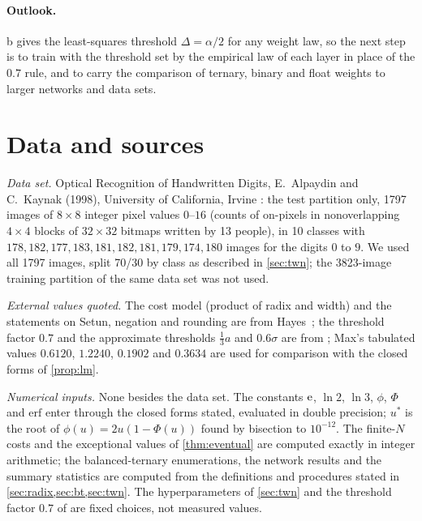 \documentclass[11pt]{article}
\theoremstyle{definition}\newtheorem{definition}[theorem]{Definition}
\theoremstyle{remark}\newtheorem{remark}[theorem]{Remark}
\begin{document}
\paragraph{Outlook.} b gives the least-squares threshold $\Delta=\alpha/2$ for any weight law, so the next step is to train with the threshold set by the empirical law of each layer in place of the $0.7$ rule, and to carry the comparison of ternary, binary and float weights to larger networks and data sets.

\section{Data and sources}\label{sec:data}
\emph{Data set.} Optical Recognition of Handwritten Digits, E.~Alpaydin and C.~Kaynak (1998), University of California, Irvine \cite{uci_digits}: the test partition only, 1797 images of $8\times8$ integer pixel values $0$--$16$ (counts of on-pixels in nonoverlapping $4\times4$ blocks of $32\times32$ bitmaps written by 13 people), in 10 classes with $178,182,177,183,181,182,181,179,174,180$ images for the digits $0$ to $9$. We used all 1797 images, split 70/30 by class as described in \cref{sec:twn}; the 3823-image training partition of the same data set was not used.

\emph{External values quoted.} The cost model (product of radix and width) and the statements on Setun, negation and rounding are from Hayes~\cite{hayes2001}; the threshold factor $0.7$ and the approximate thresholds $\frac13a$ and $0.6\sigma$ are from \cite{twn2016}; Max's tabulated values $0.6120$, $1.2240$, $0.1902$ and $0.3634$ \cite{max1960} are used for comparison with the closed forms of \cref{prop:lm}.

\emph{Numerical inputs.} None besides the data set. The constants $\mathrm e$, $\ln2$, $\ln3$, $\phi$, $\Phi$ and $\mathrm{erf}$ enter through the closed forms stated, evaluated in double precision; $u^*$ is the root of $\phi(u)=2u(1-\Phi(u))$ found by bisection to $10^{-12}$. The finite-$N$ costs and the exceptional values of \cref{thm:eventual} are computed exactly in integer arithmetic; the balanced-ternary enumerations, the network results and the summary statistics are computed from the definitions and procedures stated in \cref{sec:radix,sec:bt,sec:twn}. The hyperparameters of \cref{sec:twn} and the threshold factor $0.7$ of \cite{twn2016} are fixed choices, not measured values.
\end{document}

